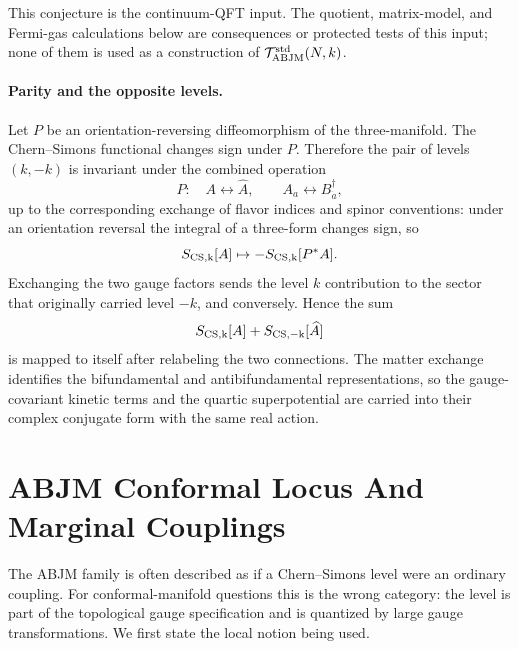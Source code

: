 This conjecture is the continuum-QFT input.  The quotient, matrix-model, and
Fermi-gas calculations below are consequences or protected tests of this
input; none of them is used as a construction of
\(\mathcal T_{\rm ABJM}^{\rm std}(N,k)\).

\paragraph{Parity and the opposite levels.}
Let \(P\) be an orientation-reversing diffeomorphism of the three-manifold.
The Chern--Simons functional changes sign under \(P\).  Therefore the pair of
levels \((k,-k)\) is invariant under the combined operation
\[
  P:\quad A\longleftrightarrow\widehat A,\qquad
  A_a\longleftrightarrow B_{\dot a}^{\dagger},
\]
up to the corresponding exchange of flavor indices and spinor conventions:
under an orientation reversal the integral of a three-form changes sign, so
\[
  S_{\rm CS,k}[A]\mapsto -S_{\rm CS,k}[P^\ast A].
\]
Exchanging the two gauge factors sends the level \(k\) contribution to the
sector that originally carried level \(-k\), and conversely.  Hence the sum
\[
  S_{\rm CS,k}[A]+S_{\rm CS,-k}[\widehat A]
\]
is mapped to itself after relabeling the two connections.  The matter
exchange identifies the bifundamental and antibifundamental representations,
so the gauge-covariant kinetic terms and the quartic superpotential are
carried into their complex conjugate form with the same real action.

\section{ABJM Conformal Locus And Marginal Couplings}
\label{sec:abjm-conformal-locus}

The ABJM family is often described as if a Chern--Simons level were an
ordinary coupling.  For conformal-manifold questions this is the wrong
category: the level is part of the topological gauge specification and is quantized
by large gauge transformations.  We first state the local notion being used.

